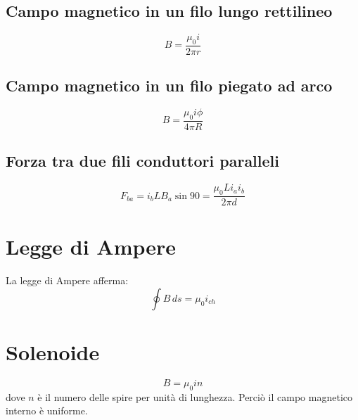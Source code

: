        \subsection*{Campo magnetico in un filo lungo rettilineo}
            \begin{equation*}
                B = \frac{\mu_0i}{2\pi r}
            \end{equation*}

        \subsection*{Campo magnetico in un filo piegato ad arco}
            \begin{equation*}
                B = \frac{\mu_0i\phi}{4\pi R}
            \end{equation*}
        
        \subsection*{Forza tra due fili conduttori paralleli}
            \begin{equation*}
                F_{ba} = i_bLB_a\sin90 = \frac{\mu_0Li_ai_b}{2\pi d}
            \end{equation*}

    \section*{Legge di Ampere} La legge di Ampere afferma:
        \begin{equation*}
            \oint B \, ds = \mu_0i_{ch}
        \end{equation*}

    \section*{Solenoide}
        \begin{equation*}
            B = \mu_0in
        \end{equation*}
    dove $n$ è il numero delle spire per unità di lunghezza. Perciò il campo 
    magnetico interno è uniforme.